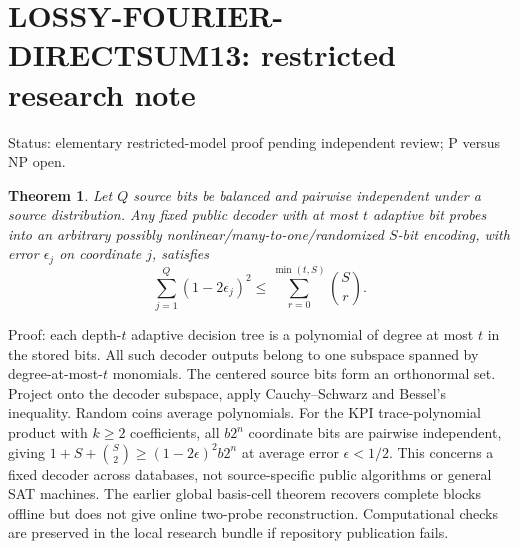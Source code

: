 \documentclass{article}
\newtheorem{theorem}{Theorem}
\begin{document}
\section*{LOSSY-FOURIER-DIRECTSUM13: restricted research note}
Status: elementary restricted-model proof pending independent review; P versus NP open.
\begin{theorem}
Let $Q$ source bits be balanced and pairwise independent under a source distribution.
Any fixed public decoder with at most $t$ adaptive bit probes into an arbitrary
possibly nonlinear/many-to-one/randomized $S$-bit encoding, with error $\epsilon_j$
on coordinate $j$, satisfies
\[
\sum_{j=1}^Q (1-2\epsilon_j)^2
\le \sum_{r=0}^{\min(t,S)}\binom Sr.
\]
\end{theorem}
\noindent Proof: each depth-$t$ adaptive decision tree is a polynomial of
degree at most $t$ in the stored bits. All such decoder outputs belong to
one subspace spanned by degree-at-most-$t$ monomials. The centered source
bits form an orthonormal set. Project onto the decoder subspace, apply
Cauchy--Schwarz and Bessel's inequality. Random coins average polynomials.
For the KPI trace-polynomial product with $k\ge2$ coefficients, all $b2^n$
coordinate bits are pairwise independent, giving
$1+S+\binom S2\ge (1-2\epsilon)^2 b2^n$
at average error $\epsilon<1/2$. This concerns a fixed decoder across
databases, not source-specific public algorithms or general SAT machines.
The earlier global basis-cell theorem recovers complete blocks offline but
does not give online two-probe reconstruction. Computational checks are
preserved in the local research bundle if repository publication fails.
\end{document}
